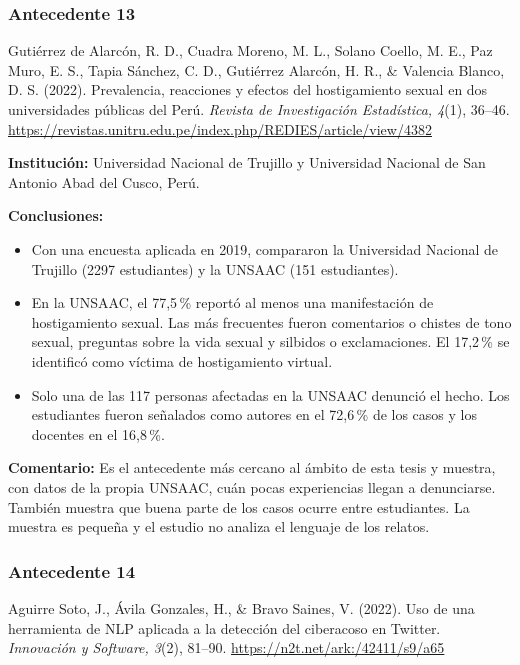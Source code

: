 \subsubsection{Antecedente 13}
\noindent Gutiérrez de Alarcón, R. D., Cuadra Moreno, M. L., Solano Coello, M. E., Paz Muro, E. S., Tapia Sánchez, C. D., Gutiérrez Alarcón, H. R., \& Valencia Blanco, D. S. (2022). Prevalencia, reacciones y efectos del hostigamiento sexual en dos universidades públicas del Perú. \textit{Revista de Investigación Estadística, 4}(1), 36--46. \url{https://revistas.unitru.edu.pe/index.php/REDIES/article/view/4382}

\noindent\textbf{Institución:} Universidad Nacional de Trujillo y Universidad Nacional de San Antonio Abad del Cusco, Perú.

\noindent\textbf{Conclusiones:}
\begin{itemize}
	\item Con una encuesta aplicada en 2019, compararon la Universidad Nacional de Trujillo (2297 estudiantes) y la UNSAAC (151 estudiantes).
	\item En la UNSAAC, el 77,5\,\% reportó al menos una manifestación de hostigamiento sexual. Las más frecuentes fueron comentarios o chistes de tono sexual, preguntas sobre la vida sexual y silbidos o exclamaciones. El 17,2\,\% se identificó como víctima de hostigamiento virtual.
	\item Solo una de las 117 personas afectadas en la UNSAAC denunció el hecho. Los estudiantes fueron señalados como autores en el 72,6\,\% de los casos y los docentes en el 16,8\,\%.
\end{itemize}

\noindent\textbf{Comentario:} Es el antecedente más cercano al ámbito de esta tesis y muestra, con datos de la propia UNSAAC, cuán pocas experiencias llegan a denunciarse. También muestra que buena parte de los casos ocurre entre estudiantes. La muestra es pequeña y el estudio no analiza el lenguaje de los relatos.

\subsubsection{Antecedente 14}
\noindent Aguirre Soto, J., Ávila Gonzales, H., \& Bravo Saines, V. (2022). Uso de una herramienta de NLP aplicada a la detección del ciberacoso en Twitter. \textit{Innovación y Software, 3}(2), 81--90. \url{https://n2t.net/ark:/42411/s9/a65}

